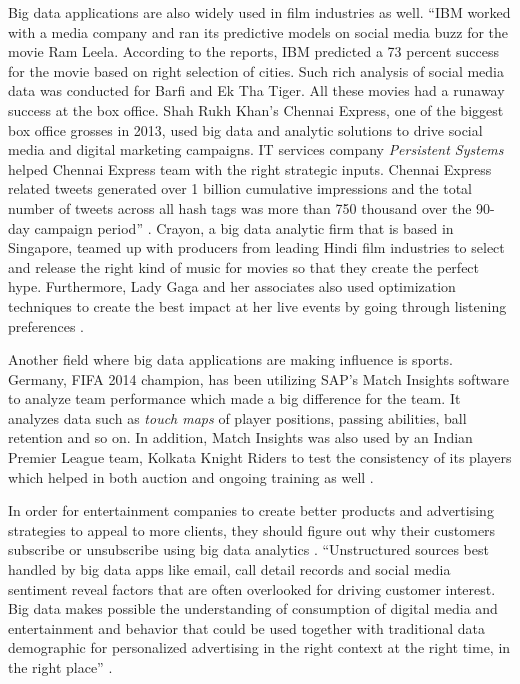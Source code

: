 Big data applications are also widely used in film industries as well. ``IBM worked with a media company and ran its predictive models on social media buzz for the movie Ram Leela. According to the reports, IBM predicted a 73 percent success for the movie based on right selection of cities. Such rich analysis of social media data was conducted for Barfi and Ek Tha Tiger. All these movies had a runaway success at the box office. Shah Rukh Khan's Chennai Express, one of the biggest box office grosses in 2013, used big data and analytic solutions to drive social media and digital marketing campaigns. IT services company {\em Persistent Systems} helped Chennai Express team with the right strategic inputs. Chennai Express related tweets generated over 1 billion cumulative impressions and the total number of tweets across all hash tags was more than 750 thousand over the 90-day campaign period'' \cite{Karania2014industry}. Crayon, a big data analytic firm that is based in Singapore, teamed up with producers from leading Hindi film industries to select and release the right kind of music for movies so that they create the perfect hype. Furthermore, Lady Gaga and her associates also used optimization techniques to create the best impact at her live events by going through listening preferences \cite{Karania2014industry}.

Another field where big data applications are making influence is sports. Germany, FIFA 2014 champion, has been utilizing SAP's Match Insights software to analyze team performance which made a big difference for the team. It analyzes data such as {\em touch maps} of player positions, passing abilities, ball retention and so on. In addition, Match Insights was also used by an Indian Premier League team, Kolkata Knight Riders to test the consistency of its players which helped in both auction and ongoing training as well \cite{Karania2014industry}.

In order for entertainment companies to create better products and advertising strategies to appeal to more clients, they should figure out why their customers subscribe or unsubscribe using big data analytics \cite{Mehta2017entertainment}. ``Unstructured sources best handled by big data apps like email, call detail records and social media sentiment reveal factors that are often overlooked for driving customer interest. Big data makes possible the understanding of consumption of digital media and entertainment and behavior that could be used together with traditional data demographic for personalized advertising in the right context at the right time, in the right place'' \cite{Mehta2017entertainment}.

